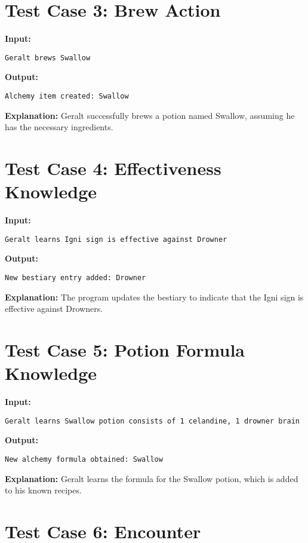 \documentclass{article}
\begin{document}
\section*{Test Case 3: Brew Action}

\textbf{Input:}
\begin{lstlisting}
Geralt brews Swallow
\end{lstlisting}

\textbf{Output:}
\begin{lstlisting}
Alchemy item created: Swallow
\end{lstlisting}

\textbf{Explanation:} Geralt successfully brews a potion named Swallow, assuming he has the necessary ingredients.

\section*{Test Case 4: Effectiveness Knowledge}

\textbf{Input:}
\begin{lstlisting}
Geralt learns Igni sign is effective against Drowner
\end{lstlisting}

\textbf{Output:}
\begin{lstlisting}
New bestiary entry added: Drowner
\end{lstlisting}

\textbf{Explanation:} The program updates the bestiary to indicate that the Igni sign is effective against Drowners.

\section*{Test Case 5: Potion Formula Knowledge}

\textbf{Input:}
\begin{lstlisting}
Geralt learns Swallow potion consists of 1 celandine, 1 drowner brain
\end{lstlisting}

\textbf{Output:}
\begin{lstlisting}
New alchemy formula obtained: Swallow
\end{lstlisting}

\textbf{Explanation:} Geralt learns the formula for the Swallow potion, which is added to his known recipes.

\section*{Test Case 6: Encounter}
\end{document}
